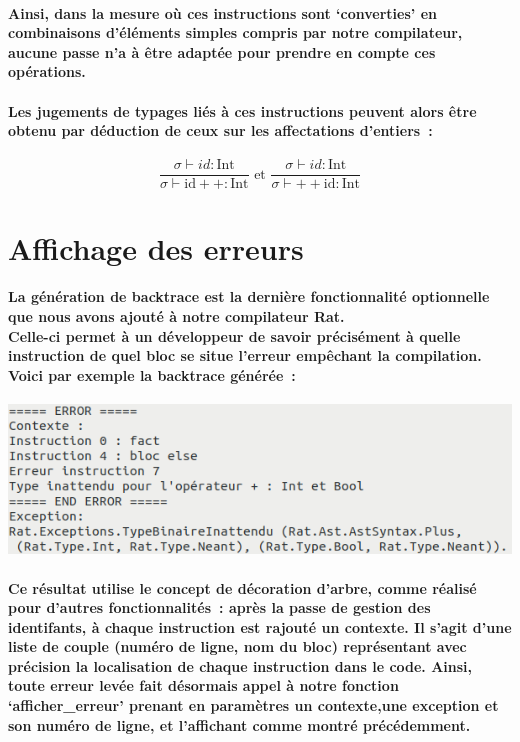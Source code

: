 \documentclass[french]{article}
\newcommand{\jugementIncrementPost}{
        \dfrac{\sigma \vdash id : \text{Int}}
              {\sigma \vdash \text{id}++ : \text{Int}}
        }
\newcommand{\jugementIncrementPre}{
        \dfrac{\sigma \vdash id : \text{Int}}
              {\sigma \vdash ++\text{id} : \text{Int}}
        }
\begin{document}
\paragraph*{Ainsi, dans la mesure où ces instructions sont `converties' en combinaisons d'éléments simples compris par notre compilateur, aucune passe n'a
à être adaptée pour prendre en compte ces opérations.}
\paragraph*{Les jugements de typages liés à ces instructions peuvent alors être obtenu par déduction de ceux sur les affectations d'entiers~:}
\[\jugementIncrementPost \text{ et } \jugementIncrementPre\]

\section{Affichage des erreurs}
\paragraph*{La génération de backtrace est la dernière fonctionnalité optionnelle que nous avons ajouté à notre compilateur Rat. \\
Celle-ci permet à un développeur de savoir précisément à quelle instruction de quel bloc se situe l'erreur empêchant la compilation. 
Voici par exemple la backtrace générée~:}

\begin{center}
        
\end{center}
\includegraphics[width=\textwidth]{backtrace.png}

\paragraph*{Ce résultat utilise le concept de décoration d'arbre, comme réalisé pour d'autres fonctionnalités~: après la passe de gestion des identifants,
à chaque instruction est rajouté un contexte. Il s'agit d'une liste de couple (numéro de ligne, nom du bloc) représentant avec précision la localisation
de chaque instruction dans le code. Ainsi, toute erreur levée fait désormais appel à notre fonction `afficher\_erreur' prenant en paramètres
un contexte,une exception et son numéro de ligne, et l'affichant comme montré précédemment.}
\end{document}

